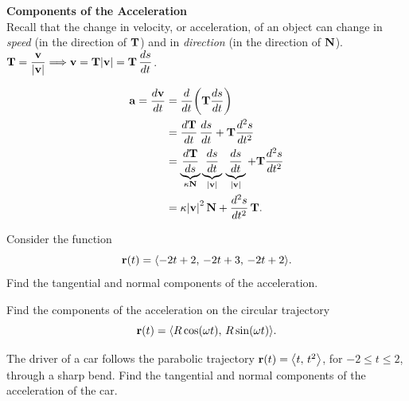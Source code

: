 \documentclass[mathNotesPreamble]{subfiles}
\begin{document}
  \pagebreak

  \textbf{Components of the Acceleration}\\
  Recall that the change in velocity, or acceleration, of an object can change in \textit{speed} (in the direction of ${\mathbf{T}}$) and in \textit{direction} (in the direction of ${\mathbf{N}}$).
  $\displaystyle{\mathbf{T}}=\frac{{\mathbf{v}}}{{\left\vert{\mathbf{v}}\right\vert}} \Longrightarrow {\mathbf{v}}={\mathbf{T}}{\left\vert{\mathbf{v}}\right\vert}={\mathbf{T}}\,\frac{ds}{dt}$.

  \begin{align*}
    {\mathbf{a}}= \frac{d{\mathbf{v}}}{dt}&={\frac{d^{}}{dt^{}}}{\left({\mathbf{T}}\frac{ds}{dt}\right)}\\
      &=\frac{d{\mathbf{T}}}{dt}\,\frac{ds}{dt}+{\mathbf{T}}\frac{d^2s}{dt^2}\\
      &=\underbrace{\frac{d{\mathbf{T}}}{ds}}_{\kappa {\mathbf{N}}}\underbrace{\frac{ds}{dt}}_{{\left\vert{\mathbf{v}}\right\vert}}\,\underbrace{\frac{ds}{dt}}_{{\left\vert{\mathbf{v}}\right\vert}}+{\mathbf{T}} \frac{d^2s}{dt^2}\\
      &=\kappa{\left\vert{\mathbf{v}}\right\vert}^2\, {\mathbf{N}}+\frac{d^2s}{dt^2}\,{\mathbf{T}}.
  \end{align*}   
  
  \noindent
  \pagebreak

  \begin{ex*}
    Consider the function
      \[{\mathbf{r}}(t)={\left\langle -2t+2,\,-2t+3,\,-2t+2 \right\rangle}.\]
    Find the tangential and normal components of the acceleration.
  \end{ex*}

  \begin{ex*}
    Find the components of the acceleration on the circular trajectory
      \[{\mathbf{r}}(t)={\left\langle R\cos(\omega t),\,R\sin(\omega t) \right\rangle}.\]
  \end{ex*}
  \pagebreak

  \begin{ex*}
    The driver of a car follows the parabolic trajectory ${\mathbf{r}}(t)={\left\langle t,\,t^2 \right\rangle}$, for $-2\leq t\leq 2$, through a sharp bend. Find the tangential and normal components of the acceleration of the car.
  \end{ex*}
  \pagebreak
\end{document}
